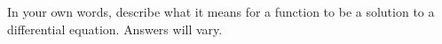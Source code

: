 {
In your own words, describe what it means for a function to be a solution to a differential equation.
}
{
Answers will vary.
}
